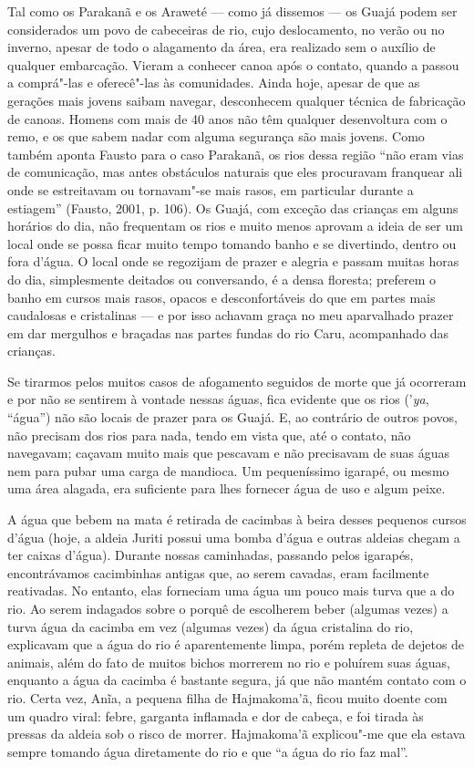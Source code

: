 Tal como os Parakanã e os Araweté --- como já dissemos --- os Guajá podem
ser considerados um povo de cabeceiras de rio, cujo deslocamento, no
verão ou no inverno, apesar de todo o alagamento da área, era realizado
sem o auxílio de qualquer embarcação. Vieram a conhecer canoa após o
contato, quando a  passou a comprá"-las e oferecê"-las às
comunidades. Ainda hoje, apesar de que as gerações mais jovens saibam
navegar, desconhecem qualquer técnica de fabricação de canoas. Homens
com mais de 40 anos não têm qualquer desenvoltura com o remo, e os que
sabem nadar com alguma segurança são mais jovens. Como também aponta
Fausto para o caso Parakanã, os rios dessa região ``não eram vias de
comunicação, mas antes obstáculos naturais que eles procuravam franquear
ali onde se estreitavam ou tornavam"-se mais rasos, em particular durante
a estiagem'' (Fausto, 2001, p. 106). Os Guajá, com exceção das crianças
em alguns horários do dia, não frequentam os rios e muito menos aprovam
a ideia de ser um local onde se possa ficar muito tempo tomando banho e
se divertindo, dentro ou fora d'água. O local onde se regozijam de
prazer e alegria e passam muitas horas do dia, simplesmente deitados ou
conversando, é a densa floresta; preferem o banho em cursos mais rasos,
opacos e desconfortáveis do que em partes mais caudalosas e cristalinas
--- e por isso achavam graça no meu aparvalhado prazer em dar mergulhos e
braçadas nas partes fundas do rio Caru, acompanhado das crianças.

Se tirarmos pelos muitos casos de afogamento seguidos de morte que já
ocorreram e por não se sentirem à vontade nessas águas, fica evidente
que os rios ('\emph{ya}, ``água'') não são locais de prazer para os Guajá.
E, ao contrário de outros povos, não precisam dos rios para nada, tendo
em vista que, até o contato, não navegavam; caçavam muito mais que
pescavam e não precisavam de suas águas nem para pubar uma carga de
mandioca. Um pequeníssimo igarapé, ou mesmo uma área alagada, era
suficiente para lhes fornecer água de uso e algum peixe.

A água que bebem na mata é retirada de cacimbas à beira desses pequenos
cursos d'água (hoje, a aldeia Juriti possui uma bomba d'água e outras
aldeias chegam a ter caixas d'água). Durante nossas caminhadas, passando
pelos igarapés, encontrávamos cacimbinhas antigas que, ao serem cavadas,
eram facilmente reativadas. No entanto, elas forneciam uma água um pouco
mais turva que a do rio. Ao serem indagados sobre o porquê de escolherem
beber (algumas vezes) a turva água da cacimba em vez (algumas vezes) da
água cristalina do rio, explicavam que a água do rio é aparentemente
limpa, porém repleta de dejetos de animais, além do fato de muitos
bichos morrerem no rio e poluírem suas águas, enquanto a água da cacimba
é bastante segura, já que não mantém contato com o rio. Certa vez, Anĩa,
a pequena filha de Hajmakoma'ã, ficou muito doente com um quadro viral:
febre, garganta inflamada e dor de cabeça, e foi tirada às pressas da
aldeia sob o risco de morrer. Hajmakoma'ã explicou"-me que ela estava
sempre tomando água diretamente do rio e que ``a água do rio faz mal''.

